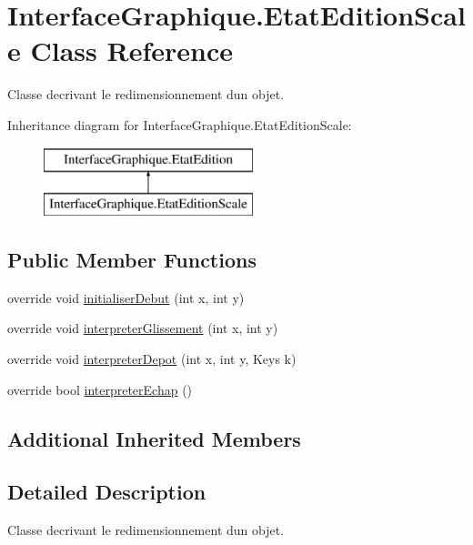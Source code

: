 \hypertarget{class_interface_graphique_1_1_etat_edition_scale}{}\section{Interface\+Graphique.\+Etat\+Edition\+Scale Class Reference}
\label{class_interface_graphique_1_1_etat_edition_scale}


Classe decrivant le redimensionnement d\textquotesingle{}un objet.  


Inheritance diagram for Interface\+Graphique.\+Etat\+Edition\+Scale\+:\begin{figure}[H]
\begin{center}
\leavevmode
\includegraphics[height=2.000000cm]{class_interface_graphique_1_1_etat_edition_scale}
\end{center}
\end{figure}
\subsection*{Public Member Functions}
\begin{DoxyCompactItemize}
\item 
override void \hyperlink{group__inf2990_ga057a0ff30fb70346d9e0ddb1d5ac1b8b}{initialiser\+Debut} (int x, int y)
\item 
override void \hyperlink{group__inf2990_ga712e07a2dcedbeed91dbeba8223c5346}{interpreter\+Glissement} (int x, int y)
\item 
override void \hyperlink{group__inf2990_ga4160cdd47c40c9bd4879240c34e3c459}{interpreter\+Depot} (int x, int y, Keys k)
\item 
override bool \hyperlink{group__inf2990_gad610071bb0715dc4cf387b4959cc1fbd}{interpreter\+Echap} ()
\end{DoxyCompactItemize}
\subsection*{Additional Inherited Members}


\subsection{Detailed Description}
Classe decrivant le redimensionnement d\textquotesingle{}un objet. 

